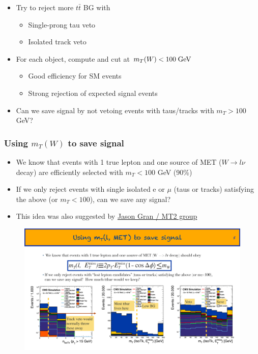\documentclass{beamer}
\begin{document}
\begin{frame}
\begin{columns}[c]
\begin{figure}
    \end{figure}
  \end{columns}
  \begin{itemize}
  \item Try to reject more $t\bar{t}$ \wpj BG with
    \begin{itemize}
    \item Single-prong tau veto
    \item Isolated track veto
    \end{itemize}
  \item For each object, compute and cut at $m_T(W) <100 \;\text{Ge}\kern-0.06667em\text{V}$
  \begin{itemize}
   \item Good efficiency for SM events
   \item Strong rejection of expected signal events
  \end{itemize}

  \item Can we save signal by not vetoing events with taus/tracks
    with $m_T>100$ GeV?
  \end{itemize}
\end{frame}

\begin{frame}
  \frametitle{Using $m_T(W)$ to save signal}
  \begin{itemize}
  \item We know that events with 1 true lepton and one source of MET
    ($W\rightarrow l\nu$ decay) are efficiently selected with $m_T<100$ GeV (90\%)
  \item If we only reject events with single isolated e or $\mu$ (taus or
    tracks) satisfying the above (or $m_T<100$), can we save any signal?
  \item This idea was also suggested by \href{https://indico.cern.ch/event/339666/session/2/contribution/50/material/slides/0.pdf}{Jason Gran / MT2 group}
  \end{itemize}
  \begin{figure}[h]
    \centering
    \includegraphics[width=\textwidth]{figures/jacks_Studies/mTIsoTracks}
  \end{figure}
\end{frame}
\end{document}
